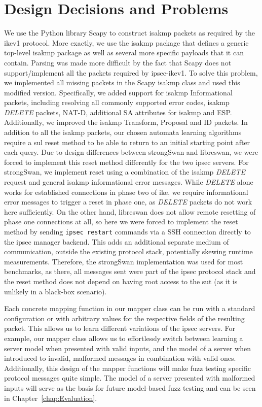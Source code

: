 \section{Design Decisions and Problems} \label{subsec:design}
We use the Python library Scapy to construct \ac{isakmp} packets as required by the \ac{ike}v1 protocol. More exactly, we use the \ac{isakmp} package that defines a generic top-level \ac{isakmp} package as well as several more specific payloads that it can contain. Parsing was made more difficult by the fact that Scapy does not support/implement all the packets required by \ac{ipsec}-\ac{ike}v1. To solve this problem, we implemented all missing packets in the Scapy \ac{isakmp} class and used this modified version. Specifically, we added support for \ac{isakmp} Informational packets, including resolving all commonly supported error codes, \ac{isakmp} \emph{DELETE} packets, NAT-D, additional SA attributes for \ac{isakmp} and ESP. Additionally, we improved the \ac{isakmp} Transform, Proposal and ID packets. In addition to all the \ac{isakmp} packets, our chosen automata learning algorithms require a \ac{sul} reset method to be able to return to an initial starting point after each query. Due to design differences between strongSwan and libreswan, we were forced to implement this reset method differently for the two \ac{ipsec} servers. For strongSwan, we implement reset using a combination of the \ac{isakmp} \emph{DELETE} request and general \ac{isakmp} informational error messages. While \emph{DELETE} alone works for established connections in phase two of \ac{ike}, we require informational error messages to trigger a reset in phase one, as \emph{DELETE} packets do not work here sufficiently. On the other hand, libreswan does not allow remote resetting of phase one connections at all, so here we were forced to implement the reset method by sending \texttt{ipsec restart} commands via a SSH connection directly to the \ac{ipsec} manager backend. This adds an additional separate medium of communication, outside the existing protocol stack, potentially skewing runtime measurements. Therefore, the strongSwan implementation was used for most benchmarks, as there, all messages sent were part of the \ac{ipsec} protocol stack and the reset method does not depend on having root access to the \ac{sut} (as it is unlikely in a black-box scenario).

Each concrete mapping function in our mapper class can be run with a standard configuration or with arbitrary values for the respective fields of the resulting packet. This allows us to learn different variations of the \ac{ipsec} servers. For example, our mapper class allows us to effortlessly switch between learning a server model when presented with valid inputs, and the model of a server when introduced to invalid, malformed messages in combination with valid ones. Additionally, this design of the mapper functions will make fuzz testing specific protocol messages quite simple. The model of a server presented with malformed inputs will serve as the basis for future model-based fuzz testing and can be seen in Chapter~\ref{chap:Evaluation}.

